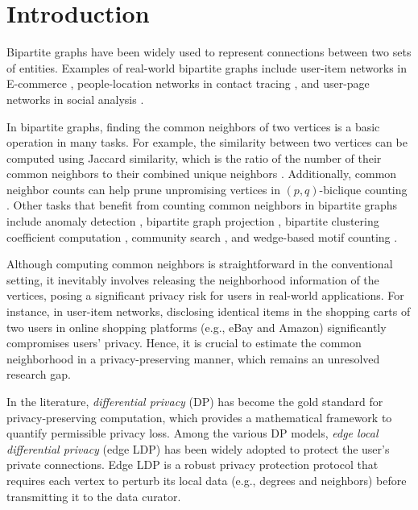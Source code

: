 \section{Introduction}
Bipartite graphs have been widely used to represent connections between two sets of entities. 
Examples of real-world bipartite graphs include user-item networks in E-commerce \cite{wang2006unifying, li2020hierarchical}, people-location networks in contact tracing \cite{chen2021efficiently}, and user-page networks in social analysis \cite{o2010essentials}. 

{
In bipartite graphs, finding the common neighbors of two vertices is a basic operation in many tasks. For example, the similarity between two vertices can be computed using Jaccard similarity, which is the ratio of the number of their common neighbors to their combined unique neighbors \cite{leicht2006vertex, tsourakakis2014toward, yang2022efficient}. 
Additionally, common neighbor counts can help prune unpromising vertices in $(p,q)$-biclique counting \cite{yang2021p, ye2023efficient}. 
Other tasks that benefit from counting common neighbors in bipartite graphs include anomaly detection \cite{sun2005neighborhood}, bipartite graph projection \cite{stankova2021node, zhang2023bipartite}, bipartite clustering coefficient computation \cite{aksoy2017measuring, huang2010link}, community search \cite{dong2021butterfly, abidi2022searching, DBLP:journals/pvldb/WangWLZZ24}, 
and wedge-based motif counting \cite{xu2022efficient, wang2023efficient}. }


Although computing common neighbors is straightforward in the conventional setting, it inevitably involves releasing the neighborhood information of the vertices, posing a significant privacy risk for users in real-world applications. For instance, in user-item networks, disclosing identical items in the shopping carts of two users in online shopping platforms (e.g., eBay and Amazon) significantly compromises users' privacy. 
Hence, it is crucial to estimate the common neighborhood in a privacy-preserving manner, which remains an unresolved research gap.

In the literature, {\em differential privacy} (DP) \cite{dwork2014algorithmic} has become the gold standard for privacy-preserving computation, which provides a mathematical framework to quantify permissible privacy loss. 
Among the various DP models, {\em edge local differential privacy} (edge LDP) \cite{qin_generating_2017, zhang2018two, ye2020lf} has been widely adopted to protect the user's private connections. 
Edge LDP is a robust privacy protection protocol that requires each vertex to perturb its local data (e.g., degrees and neighbors) before transmitting it to the data curator. 

